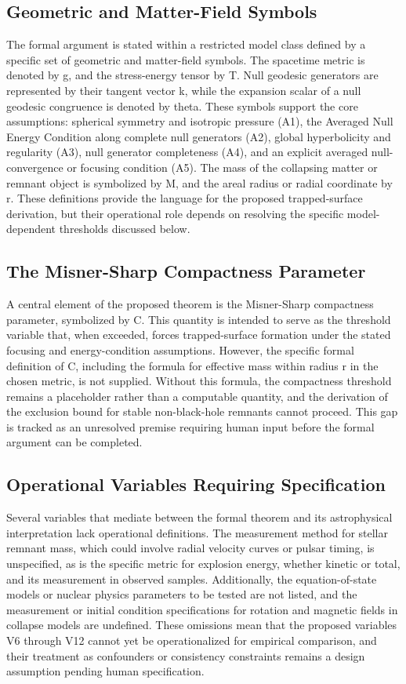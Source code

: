 \documentclass[conference]{IEEEtran}
\begin{document}
\subsection{Geometric and Matter-Field Symbols}
The formal argument is stated within a restricted model class defined by a specific set of geometric and matter-field symbols. The spacetime metric is denoted by g, and the stress-energy tensor by T. Null geodesic generators are represented by their tangent vector k, while the expansion scalar of a null geodesic congruence is denoted by theta. These symbols support the core assumptions: spherical symmetry and isotropic pressure (A1), the Averaged Null Energy Condition along complete null generators (A2), global hyperbolicity and regularity (A3), null generator completeness (A4), and an explicit averaged null-convergence or focusing condition (A5). The mass of the collapsing matter or remnant object is symbolized by M, and the areal radius or radial coordinate by r. These definitions provide the language for the proposed trapped-surface derivation, but their operational role depends on resolving the specific model-dependent thresholds discussed below.

\subsection{The Misner-Sharp Compactness Parameter}
A central element of the proposed theorem is the Misner-Sharp compactness parameter, symbolized by C. This quantity is intended to serve as the threshold variable that, when exceeded, forces trapped-surface formation under the stated focusing and energy-condition assumptions. However, the specific formal definition of C, including the formula for effective mass within radius r in the chosen metric, is not supplied. Without this formula, the compactness threshold remains a placeholder rather than a computable quantity, and the derivation of the exclusion bound for stable non-black-hole remnants cannot proceed. This gap is tracked as an unresolved premise requiring human input before the formal argument can be completed.

\subsection{Operational Variables Requiring Specification}
Several variables that mediate between the formal theorem and its astrophysical interpretation lack operational definitions. The measurement method for stellar remnant mass, which could involve radial velocity curves or pulsar timing, is unspecified, as is the specific metric for explosion energy, whether kinetic or total, and its measurement in observed samples. Additionally, the equation-of-state models or nuclear physics parameters to be tested are not listed, and the measurement or initial condition specifications for rotation and magnetic fields in collapse models are undefined. These omissions mean that the proposed variables V6 through V12 cannot yet be operationalized for empirical comparison, and their treatment as confounders or consistency constraints remains a design assumption pending human specification.
\end{document}
